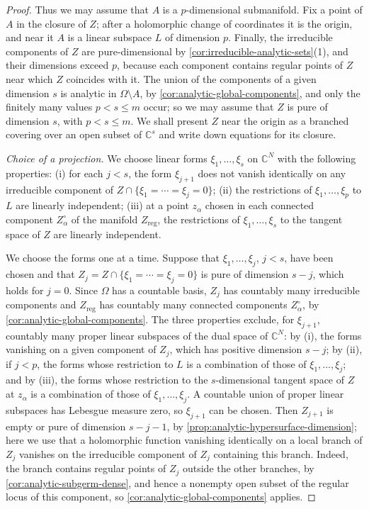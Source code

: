\begin{proof}
Thus we may assume that $A$ is a $p$-dimensional submanifold. Fix a point of $A$ in the closure of $Z$; after a holomorphic change of coordinates it is the origin, and near it $A$ is a linear subspace $L$ of dimension $p$. Finally, the irreducible components of $Z$ are pure-dimensional by \cref{cor:irreducible-analytic-sets}(1), and their dimensions exceed $p$, because each component contains regular points of $Z$ near which $Z$ coincides with it. The union of the components of a given dimension $s$ is analytic in $\Omega\setminus A$, by \cref{cor:analytic-global-components}, and only the finitely many values $p<s\leq m$ occur; so we may assume that $Z$ is pure of dimension $s$, with $p<s\leq m$. We shall present $Z$ near the origin as a branched covering over an open subset of $\mathbb C^s$ and write down equations for its closure.

\emph{Choice of a projection.} We choose linear forms $\xi_1,\ldots,\xi_s$ on $\mathbb C^N$ with the following properties: (i) for each $j<s$, the form $\xi_{j+1}$ does not vanish identically on any irreducible component of $Z\cap\{\xi_1=\cdots=\xi_j=0\}$; (ii) the restrictions of $\xi_1,\ldots,\xi_p$ to $L$ are linearly independent; (iii) at a point $z_\alpha$ chosen in each connected component $Z^\circ_\alpha$ of the manifold $Z_{\mathrm{reg}}$, the restrictions of $\xi_1,\ldots,\xi_s$ to the tangent space of $Z$ are linearly independent.

We choose the forms one at a time. Suppose that $\xi_1,\ldots,\xi_j$, $j<s$, have been chosen and that $Z_j=Z\cap\{\xi_1=\cdots=\xi_j=0\}$ is pure of dimension $s-j$, which holds for $j=0$. Since $\Omega$ has a countable basis, $Z_j$ has countably many irreducible components and $Z_{\mathrm{reg}}$ has countably many connected components $Z^\circ_\alpha$, by \cref{cor:analytic-global-components}. The three properties exclude, for $\xi_{j+1}$, countably many proper linear subspaces of the dual space of $\mathbb C^N$: by (i), the forms vanishing on a given component of $Z_j$, which has positive dimension $s-j$; by (ii), if $j<p$, the forms whose restriction to $L$ is a combination of those of $\xi_1,\ldots,\xi_j$; and by (iii), the forms whose restriction to the $s$-dimensional tangent space of $Z$ at $z_\alpha$ is a combination of those of $\xi_1,\ldots,\xi_j$. A countable union of proper linear subspaces has Lebesgue measure zero, so $\xi_{j+1}$ can be chosen. Then $Z_{j+1}$ is empty or pure of dimension $s-j-1$, by \cref{prop:analytic-hypersurface-dimension}; here we use that a holomorphic function vanishing identically on a local branch of $Z_j$ vanishes on the irreducible component of $Z_j$ containing this branch. Indeed, the branch contains regular points of $Z_j$ outside the other branches, by \cref{cor:analytic-subgerm-dense}, and hence a nonempty open subset of the regular locus of this component, so \cref{cor:analytic-global-components} applies.


\end{proof}
